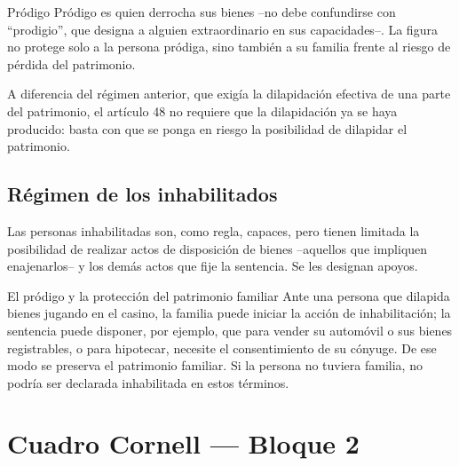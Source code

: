 \documentclass[12pt,oneside]{book}
\begin{document}
\begin{definition}{Pródigo}
Pródigo es quien derrocha sus bienes --no debe confundirse con ``prodigio'', que designa a alguien extraordinario en sus capacidades--. La figura no protege solo a la persona pródiga, sino también a su familia frente al riesgo de pérdida del patrimonio.
\end{definition}

A diferencia del régimen anterior, que exigía la dilapidación efectiva de una parte del patrimonio, el artículo 48 no requiere que la dilapidación ya se haya producido: basta con que se ponga en riesgo la posibilidad de dilapidar el patrimonio.

\subsection{Régimen de los inhabilitados}

Las personas inhabilitadas son, como regla, capaces, pero tienen limitada la posibilidad de realizar actos de disposición de bienes --aquellos que impliquen enajenarlos-- y los demás actos que fije la sentencia. Se les designan apoyos.

\begin{example}{El pródigo y la protección del patrimonio familiar}
Ante una persona que dilapida bienes jugando en el casino, la familia puede iniciar la acción de inhabilitación; la sentencia puede disponer, por ejemplo, que para vender su automóvil o sus bienes registrables, o para hipotecar, necesite el consentimiento de su cónyuge. De ese modo se preserva el patrimonio familiar. Si la persona no tuviera familia, no podría ser declarada inhabilitada en estos términos.
\end{example}

\section{Cuadro Cornell --- Bloque 2}
\end{document}
